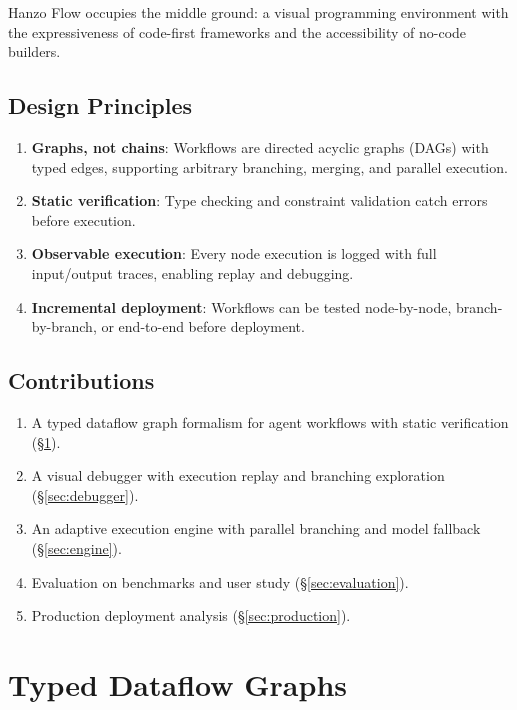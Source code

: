 \documentclass[11pt,twocolumn]{article}
\begin{document}
Hanzo Flow occupies the middle ground: a visual programming environment with the expressiveness of code-first frameworks and the accessibility of no-code builders.

\subsection{Design Principles}

\begin{enumerate}[leftmargin=1.4em]
    \item \textbf{Graphs, not chains}: Workflows are directed acyclic graphs (DAGs) with typed edges, supporting arbitrary branching, merging, and parallel execution.
    \item \textbf{Static verification}: Type checking and constraint validation catch errors before execution.
    \item \textbf{Observable execution}: Every node execution is logged with full input/output traces, enabling replay and debugging.
    \item \textbf{Incremental deployment}: Workflows can be tested node-by-node, branch-by-branch, or end-to-end before deployment.
\end{enumerate}

\subsection{Contributions}

\begin{enumerate}[leftmargin=1.4em]
    \item A typed dataflow graph formalism for agent workflows with static verification (\S\ref{sec:formalism}).
    \item A visual debugger with execution replay and branching exploration (\S\ref{sec:debugger}).
    \item An adaptive execution engine with parallel branching and model fallback (\S\ref{sec:engine}).
    \item Evaluation on benchmarks and user study (\S\ref{sec:evaluation}).
    \item Production deployment analysis (\S\ref{sec:production}).
\end{enumerate}

\section{Typed Dataflow Graphs}
\label{sec:formalism}
\end{document}
